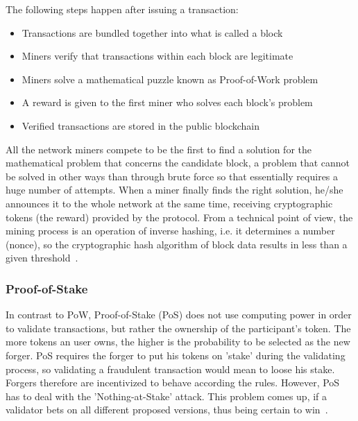 The following steps happen after issuing a transaction:
\begin{itemize}
  \item Transactions are bundled together into what is called a block
  \item Miners verify that transactions within each block are legitimate
  \item Miners solve a mathematical puzzle known as Proof-of-Work problem
  \item A reward is given to the first miner who solves each block's problem
  \item Verified transactions are stored in the public blockchain
\end{itemize}
All the network miners compete to be the first to find a solution for the mathematical problem that concerns the candidate block, a problem that cannot be solved in other ways than through brute force so that essentially requires a huge number of attempts.
When a miner finally finds the right solution, he/she announces it to the whole network at the same time, receiving cryptographic tokens (the reward) provided by the protocol.
From a technical point of view, the mining process is an operation of inverse hashing, i.e. it determines a number (nonce), so the cryptographic hash algorithm of block data results in less than a given threshold~\cite{PoW}.

\subsubsection{Proof-of-Stake}

In contrast to PoW, Proof-of-Stake (PoS) does not use computing power in order to validate transactions, but rather the ownership of the participant's token.
The more tokens an user owns, the higher is the probability to be selected as the new forger.
PoS requires the forger to put his tokens on 'stake' during the validating process, so validating a fraudulent transaction would mean to loose his stake.
Forgers therefore are incentivized to behave according the rules. However, PoS has to deal with the 'Nothing-at-Stake' attack. This problem comes up, if a validator bets on all different proposed versions, thus being certain to win~\cite{PoS}.

